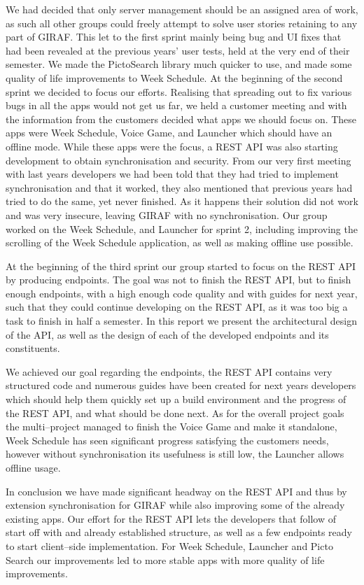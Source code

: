 \bigskip
We had decided that only server management should be an assigned area of work, as such all other groups could freely attempt to solve user stories retaining to any part of GIRAF.
This let to the first sprint mainly being bug and UI fixes that had been revealed at the previous years' user tests, held at the very end of their semester.
We made the PictoSearch library much quicker to use, and made some quality of life improvements to Week Schedule.
At the beginning of the second sprint we decided to focus our efforts.
Realising that spreading out to fix various bugs in all the apps would not get us far, we held a customer meeting and with the information from the customers decided what apps we should focus on.
These apps were Week Schedule, Voice Game, and Launcher which should have an offline mode.
While these apps were the focus, a REST API was also starting development to obtain synchronisation and security.
From our very first meeting with last years developers we had been told that they had tried to implement synchronisation and that it worked, they also mentioned that previous years had tried to do the same, yet never finished.
As it happens their solution did not work and was very insecure, leaving GIRAF with no synchronisation.
Our group worked on the Week Schedule, and Launcher for sprint 2, including improving the scrolling of the Week Schedule application, as well as making offline use possible.

\bigskip
At the beginning of the third sprint our group started to focus on the REST API by producing endpoints.
The goal was not to finish the REST API, but to finish enough endpoints, with a high enough code quality and with guides for next year, such that they could continue developing on the REST API, as it was too big a task to finish in half a semester.
In this report we present the architectural design of the API, as well as the design of each of the developed endpoints and its constituents.

We achieved our goal regarding the endpoints, the REST API contains very structured code and numerous guides have been created for next years developers which should help them quickly set up a build environment and the progress of the REST API, and what should be done next.
As for the overall project goals the multi--project managed to finish the Voice Game and make it standalone, Week Schedule has seen significant progress satisfying the customers needs, however without synchronisation its usefulness is still low, the Launcher allows offline usage.

In conclusion we have made significant headway on the REST API and thus by extension synchronisation for GIRAF while also improving some of the already existing apps.
Our effort for the REST API lets the developers that follow of start off with and already established structure, as well as a few endpoints ready to start client--side implementation.
For Week Schedule, Launcher and Picto Search our improvements led to more stable apps with more quality of life improvements.
